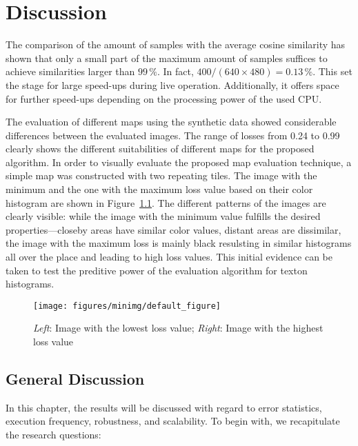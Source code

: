\chapter{Discussion}
\label{chap:discussion}

The comparison of the amount of samples with the average cosine
similarity has shown that only a small part of the maximum amount of
samples suffices to achieve similarities larger than $99\,\%$. In
fact, $400 / (640 \times 480) = 0.13\,\%$. This set the stage for
large speed-ups during live operation. Additionally, it offers space
for further speed-ups depending on the processing power of the used
CPU.

The evaluation of different maps using the synthetic data showed
considerable differences between the evaluated images. The range of
losses from 0.24 to 0.99 clearly shows the different suitabilities of different maps for the proposed algorithm. In order to visually evaluate the
proposed map evaluation technique, a simple map was constructed with
two repeating tiles. The image with the minimum and the one with the
maximum loss value based on their color histogram are shown in
Figure~\ref{fig:minmaximg}. The different patterns of the images are
clearly visible: while the image with the minimum value fulfills the
desired properties---closeby areas have similar color values, distant
areas are dissimilar, the image with the maximum loss is mainly black
resulsting in similar histograms all over the place and leading to
high loss values. This initial evidence can be taken to test the
preditive power of the evaluation algorithm for texton histograms.

\begin{figure}[h!]
\begin{center}
\texttt{[image: figures/minimg/default\_figure]}
\caption{{\label{fig:minmaximg} \emph{Left}: Image with the lowest loss value; \emph{Right}:
    Image with the highest loss value%
}}
\end{center}
\end{figure}

\section{General Discussion}
\label{sec:generaldiscussion}

In this chapter, the results will be discussed with regard to error
statistics, execution frequency, robustness, and scalability. To begin
with, we recapitulate the research questions:

